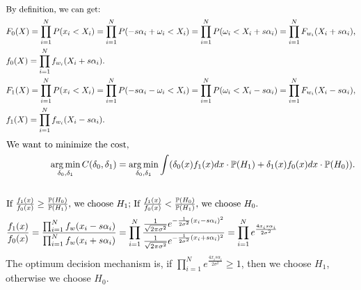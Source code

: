 \documentclass[letter, 12pt]{article}
\DeclareMathOperator*{\argmin}{arg\,min}
\begin{document}
\begin{enumerate}[wide = 0pt, label = \textbf{Problem \arabic*:}]
\begin{subquestion}
\begin{align*}
				\end{align*}
				\begin{align*}
					\shortintertext{By definition, we can get:} 
					&F_0(X) = \prod_{i=1}^{N}P(x_i < X_i) = \prod_{i=1}^{N}P(-s\alpha_i + \omega_i < X_i) = \prod_{i=1}^{N}P(\omega_i< X_i +s\alpha_i) = \prod_{i=1}^{N}F_{w_i}(X_i + s\alpha_i) ,\\
					&f_0(X) = \prod_{i=1}^{N}f_{w_i}(X_i + s\alpha_i) .\\
					&F_1(X) = \prod_{i=1}^{N}P(x_i < X_i) = \prod_{i=1}^{N}P(-s\alpha_i - \omega_i < X_i) = \prod_{i=1}^{N}P(\omega_i< X_i -s\alpha_i) = \prod_{i=1}^{N}F_{w_i}(X_i - s\alpha_i) ,\\
					&f_1(X) = \prod_{i=1}^{N}f_{w_i}(X_i - s\alpha_i) .
				\end{align*}
				\begin{align*}
					\shortintertext{We want to minimize the cost, }
					\argmin_{\delta_0, \delta_1} C(\delta_0, \delta_1) &= \argmin_{\delta_0, \delta_1} \int(\delta_0(x)f_1(x)dx \cdot \mathbb{P}(H_1) + \delta_1(x)f_0(x)dx \cdot \mathbb{P}(H_0)). \\
					\\
					\shortintertext{If $ \frac{f_1(x)}{f_0(x)} \ge \frac{\mathbb{P}(H_0)}{\mathbb{P}(H_1)} $, we choose $ H_1 $; If $ \frac{f_1(x)}{f_0(x)} < \frac{\mathbb{P}(H_0)}{\mathbb{P}(H_1)} $, we choose $ H_0 $.}
					\frac{f_1(x)}{f_0(x)} = \frac{\prod_{i=1}^{N}f_w(x_i - s\alpha_i)}{\prod_{i=1}^{N}f_w(x_i + s\alpha_i)} &= \prod_{i=1}^{N} \frac{\frac{1}{\sqrt{2\pi\sigma^2}}e^{-\frac{1}{2\sigma^2}(x_i - s\alpha_i)^2}}{\frac{1}{\sqrt{2\pi\sigma^2}}e^{-\frac{1}{2\sigma^2}(x_i + s\alpha_i)^2}} = \prod_{i=1}^{N} e^{\frac{4x_i s\alpha_i}{2\sigma^2}}
				\end{align*}
			The optimum decision mechanism is, if $ \prod_{i=1}^{N} e^{\frac{4x_i s\alpha_i}{2\sigma^2}} \ge 1 $, then we choose $ H_1 $, otherwise we choose $ H_0 $. \\
			

\end{subquestion}
\end{enumerate}
\end{document}
